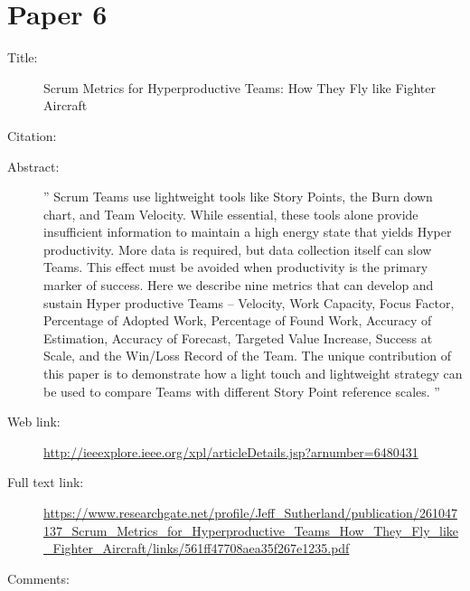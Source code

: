 \documentclass{scrartcl}
\begin{document}
\section*{Paper 6}
\begin{description}
	\item[Title:] Scrum Metrics for Hyperproductive Teams: How They Fly like Fighter Aircraft 
	\item[Citation:] \cite{Downey}
	\item[Abstract:] '' Scrum Teams use lightweight tools like Story Points, the Burn down chart, and Team Velocity. While essential, these tools alone provide insufficient information to maintain a high energy state that yields Hyper productivity. More data is required, but data collection itself can slow Teams. This effect must be avoided when productivity is the primary marker of success. Here we describe nine metrics that can develop and sustain Hyper productive Teams -- Velocity, Work Capacity, Focus Factor, Percentage of Adopted Work, Percentage of Found Work, Accuracy of Estimation, Accuracy of Forecast, Targeted Value Increase, Success at Scale, and the Win/Loss Record of the Team. The unique contribution of this paper is to demonstrate how a light touch and lightweight strategy can be used to compare Teams with different Story Point reference scales. ''
	\item[Web link:] \url{http://ieeexplore.ieee.org/xpl/articleDetails.jsp?arnumber=6480431}
	\item[Full text link:] \url{https://www.researchgate.net/profile/Jeff_Sutherland/publication/261047137_Scrum_Metrics_for_Hyperproductive_Teams_How_They_Fly_like_Fighter_Aircraft/links/561ff47708aea35f267e1235.pdf}
	\item[Comments:] 
\end{description}




\end{document}
